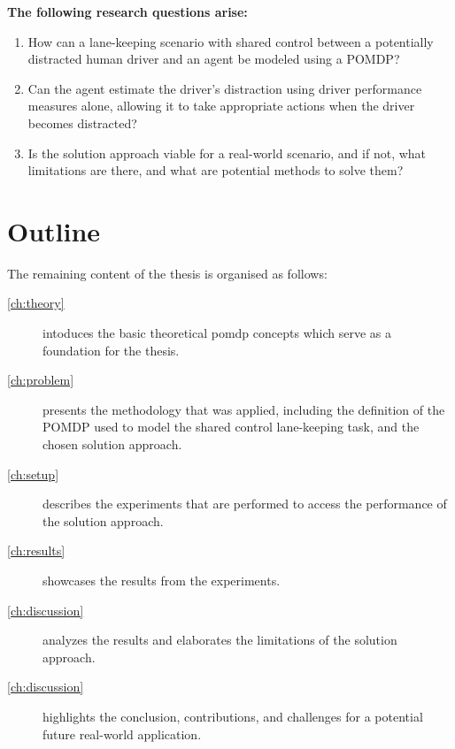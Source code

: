 \vspace{1em}
\noindent
\textbf{The following research questions arise:}
\begin{enumerate}
    \item How can a lane-keeping scenario with shared control between a potentially distracted human driver and an agent be modeled using a POMDP?
    \item Can the agent estimate the driver's distraction using driver performance measures alone, allowing it to take appropriate actions when the driver becomes distracted?
    \item Is the solution approach viable for a real-world scenario, and if not, what limitations are there, and what are potential methods to solve them?
\end{enumerate}


\section{Outline}

The remaining content of the thesis is organised as follows:
\begin{description}
    \item[\cref{ch:theory}] intoduces the basic theoretical \gls{pomdp} concepts which serve as a foundation for the thesis.

    \item[\cref{ch:problem}]
    presents the methodology that was applied, including the definition of the POMDP used to model the shared control lane-keeping task, and the chosen solution approach.
    
    \item[\cref{ch:setup}]
    describes the experiments that are performed to access the performance of the solution approach.
    
    \item[\cref{ch:results}]
    showcases the results from the experiments.

    \item[\cref{ch:discussion}]
    analyzes the results and elaborates the limitations of the solution approach.

    \item[\cref{ch:discussion}]
    highlights the conclusion, contributions, and challenges for a potential future real-world application.

\end{description}